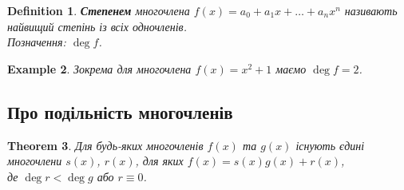 \documentclass[a4paper, 10pt]{extarticle}
\theoremstyle{theoremdd}
\newtheorem{theorem}{Theorem}[subsection]
\theoremstyle{theoremdd}
\newtheorem{definition}[theorem]{Definition}
\theoremstyle{theoremdd}
\theoremstyle{theoremdd}
\newtheorem{example}[theorem]{Example}
\theoremstyle{theoremdd}
\theoremstyle{theoremdd}
\theoremstyle{theoremdd}
\theoremstyle{theoremdd}
\begin{document}
\begin{definition}
\textbf{Степенем} многочлена $f(x) = a_0 + a_1 x + \dots + a_n x^n$ називають найвищий степінь із всіх одночленів.\\
Позначення: $\deg f$.
\end{definition}

\begin{example}
Зокрема для многочлена $f(x) = x^2 + 1$ маємо $\deg f = 2$.
\end{example}

\subsection{Про подільність многочленів}
\begin{theorem}
Для будь-яких многочленів $f(x)$ та $g(x)$ існують \textit{єдині} многочлени $s(x)$, $r(x)$, для яких $f(x) = s(x) g(x) + r(x)$,\\
де $\deg r < \deg g$ або $r \equiv 0$.
\end{theorem}
\end{document}
